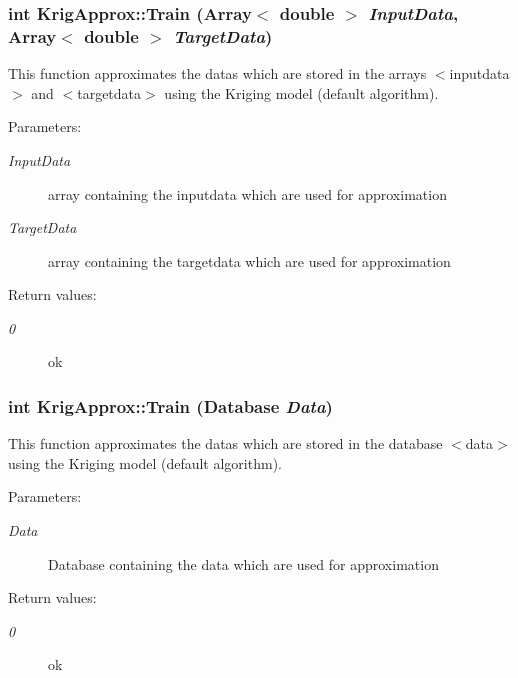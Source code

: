 \subsubsection{\setlength{\rightskip}{0pt plus 5cm}int Krig\-Approx::Train (Array$<$ double $>$ {\em Input\-Data}, Array$<$ double $>$ {\em Target\-Data})}\label{classKrigApprox_a11}


This function approximates the datas which are stored in the arrays $<$inputdata$>$ and $<$targetdata$>$ using the Kriging model (default algorithm). 

\begin{Desc}
\item[Parameters:]
\begin{description}
\item[{\em Input\-Data}]array containing the inputdata which are used for approximation \item[{\em Target\-Data}]array containing the targetdata which are used for approximation \end{description}
\end{Desc}
\begin{Desc}
\item[Return values:]
\begin{description}
\item[{\em 0}]ok \end{description}
\end{Desc}
\subsubsection{\setlength{\rightskip}{0pt plus 5cm}int Krig\-Approx::Train (Database {\em Data})}\label{classKrigApprox_a10}


This function approximates the datas which are stored in the database $<$data$>$ using the Kriging model (default algorithm). 

\begin{Desc}
\item[Parameters:]
\begin{description}
\item[{\em Data}]Database containing the data which are used for approximation \end{description}
\end{Desc}
\begin{Desc}
\item[Return values:]
\begin{description}
\item[{\em 0}]ok \end{description}
\end{Desc}
